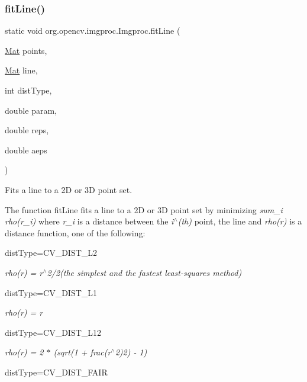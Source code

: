 \subsubsection{\texorpdfstring{fit\+Line()}{fitLine()}}
{\footnotesize\ttfamily static void org.\+opencv.\+imgproc.\+Imgproc.\+fit\+Line (\begin{DoxyParamCaption}\item[{\mbox{\hyperlink{classorg_1_1opencv_1_1core_1_1_mat}{Mat}}}]{points,  }\item[{\mbox{\hyperlink{classorg_1_1opencv_1_1core_1_1_mat}{Mat}}}]{line,  }\item[{int}]{dist\+Type,  }\item[{double}]{param,  }\item[{double}]{reps,  }\item[{double}]{aeps }\end{DoxyParamCaption})\hspace{0.3cm}{\ttfamily [static]}}

Fits a line to a 2D or 3D point set.

The function {\ttfamily fit\+Line} fits a line to a 2D or 3D point set by minimizing {\itshape sum\+\_\+i rho(r\+\_\+i)} where {\itshape r\+\_\+i} is a distance between the {\itshape i$^\wedge$(th)} point, the line and {\itshape rho(r)} is a distance function, one of the following\+:


\begin{DoxyItemize}
\item dist\+Type=C\+V\+\_\+\+D\+I\+S\+T\+\_\+\+L2 
\end{DoxyItemize}

{\itshape rho(r) = r$^\wedge$2/2(the simplest and the fastest least-\/squares method)}


\begin{DoxyItemize}
\item dist\+Type=C\+V\+\_\+\+D\+I\+S\+T\+\_\+\+L1 
\end{DoxyItemize}

{\itshape rho(r) = r}


\begin{DoxyItemize}
\item dist\+Type=C\+V\+\_\+\+D\+I\+S\+T\+\_\+\+L12 
\end{DoxyItemize}

{\itshape rho(r) = 2 $\ast$ (sqrt(1 + frac(r$^\wedge$2)2) -\/ 1)}


\begin{DoxyItemize}
\item dist\+Type=C\+V\+\_\+\+D\+I\+S\+T\+\_\+\+F\+A\+IR 
\end{DoxyItemize}

